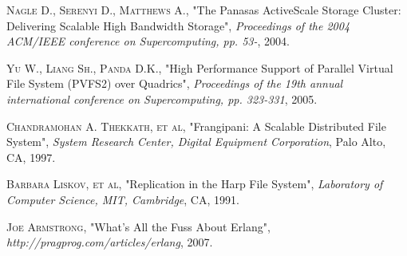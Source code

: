 \documentclass[a4paper,12pt]{article}
\begin{document}
\begin{thebibliography}{99}
  \textsc{Nagle D., Serenyi D., Matthews A.},
  "The Panasas ActiveScale Storage Cluster: Delivering Scalable High Bandwidth Storage",
  \emph{Proceedings of the 2004 ACM/IEEE conference on Supercomputing, pp. 53-},
  2004.

  \textsc{Yu W., Liang Sh., Panda D.K.},
  "High Performance Support of Parallel Virtual File System (PVFS2) over Quadrics",
  \emph{Proceedings of the 19th annual international conference on Supercomputing, pp. 323-331},
  2005.

  \textsc{Chandramohan A. Thekkath, et al},
  "Frangipani: A Scalable Distributed File System",
  \emph{System Research Center, Digital Equipment Corporation},
  Palo Alto, CA, 1997.

  \textsc{Barbara Liskov, et al},
  "Replication in the Harp File System",
  \emph{Laboratory of Computer Science, MIT, Cambridge},
  CA, 1991.

  \textsc{Joe Armstrong},
  "What's All the Fuss About Erlang",
  \emph{http://pragprog.com/articles/erlang},
  2007.
\end{thebibliography}
\end{document}
